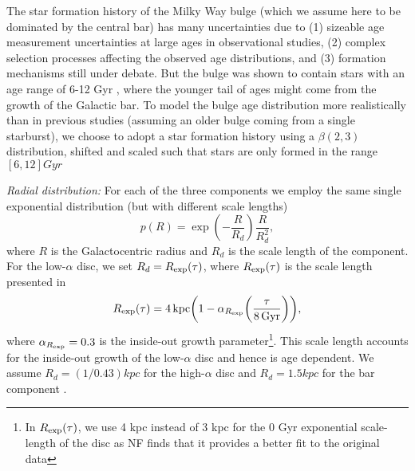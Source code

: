 The star formation history of the Milky Way bulge (which we assume here to be dominated by the central bar) has many uncertainties due to (1) sizeable age measurement uncertainties at large ages in observational studies, (2) complex selection processes affecting the observed age distributions, and (3) formation mechanisms still under debate. But the bulge was shown to contain stars with an age range of 6-12 Gyr \citep[e.g.,][]{Bovy+2019}, where the younger tail of ages might come from the growth of the Galactic bar. To model the bulge age distribution more realistically than in previous studies (assuming an older bulge coming from a single starburst), we choose to adopt a star formation history using a $\beta(2,3)$ distribution, shifted and scaled such that stars are only formed in the range $[6, 12] \unit{Gyr}$

\textit{Radial distribution:} For each of the three components we employ the same single exponential distribution (but with different scale lengths)
\begin{equation}\label{eq:galaxy_R}
    p(R) = \exp(-\frac{R}{R_d}) \frac{R}{R_d^2},
\end{equation}
where $R$ is the Galactocentric radius and $R_d$ is the scale length of the component. For the low-$\alpha$ disc, we set $R_d = R_{\rm exp}(\tau)$, where $R_{\rm exp}(\tau)$ is the scale length presented in \citet[][Eq.~5]{Frankel+2018}
\begin{equation}
    R_{\rm exp}(\tau) = 4 \unit{kpc} \qty(1 - \alpha_{R_{\rm exp}} \qty(\frac{\tau}{8 \unit{Gyr}})),
\end{equation}
where $\alpha_{R_{\rm exp}} = 0.3$ is the inside-out growth parameter\footnote{In $R_{\rm exp}(\tau)$, we use 4 kpc instead of 3 kpc for the 0 Gyr exponential scale-length of the disc as NF finds that it provides a better fit to the original data}. This scale length accounts for the inside-out growth of the low-$\alpha$ disc and hence is age dependent. We assume $R_d = (1 / 0.43) \unit{kpc}$ for the high-$\alpha$ disc \citep[][Table~1]{Bovy+2016} and $R_d = 1.5 \unit{kpc}$ for the bar component \citep{Bovy+2019}.

